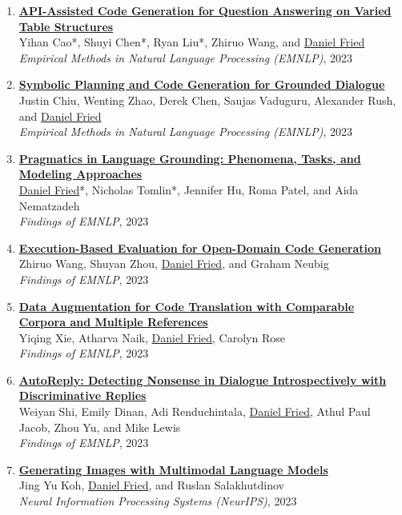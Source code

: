 \begin{enumerate}[leftmargin=-1mm,partopsep=0pt]
\item \href{https://arxiv.org/abs/2310.14687}{\textbf{API-Assisted Code Generation for Question Answering on Varied Table Structures}} \\
  Yihan Cao*, Shuyi Chen*, Ryan Liu*, Zhiruo Wang, and \underline{Daniel Fried}\\
  \emph{Empirical Methods in Natural Language Processing (EMNLP)}, 2023

\item \href{https://arxiv.org/abs/2310.17140}{\textbf{Symbolic Planning and Code Generation for Grounded Dialogue }} \\
  Justin Chiu, Wenting Zhao, Derek Chen, Saujas Vaduguru, Alexander Rush, and \underline{Daniel Fried}\\
  \emph{Empirical Methods in Natural Language Processing (EMNLP)}, 2023

\item \href{https://arxiv.org/abs/2211.08371}{\textbf{Pragmatics in Language Grounding: Phenomena, Tasks, and Modeling Approaches}} \\
  \underline{Daniel Fried}*, Nicholas Tomlin*, Jennifer Hu, Roma Patel, and Aida Nematzadeh\\
  \emph{Findings of EMNLP}, 2023

\item \href{https://arxiv.org/abs/2212.10481}{\textbf{Execution-Based Evaluation for Open-Domain Code Generation}} \\
  Zhiruo Wang, Shuyan Zhou, \underline{Daniel Fried}, and Graham Neubig\\
  \emph{Findings of EMNLP}, 2023

\item \href{https://arxiv.org/abs/2311.00317}{\textbf{Data Augmentation for Code Translation with Comparable Corpora and Multiple References}} \\
  Yiqing Xie, Atharva Naik, \underline{Daniel Fried}, Carolyn Rose\\
  \emph{Findings of EMNLP}, 2023

\item \href{https://arxiv.org/abs/2211.12615}{\textbf{AutoReply: Detecting Nonsense in Dialogue Introspectively with Discriminative Replies}} \\
  Weiyan Shi, Emily Dinan, Adi Renduchintala, \underline{Daniel Fried}, Athul Paul Jacob, Zhou Yu, and Mike Lewis\\
  \emph{Findings of EMNLP}, 2023

\item \href{https://arxiv.org/abs/2305.17216}{\textbf{Generating Images with Multimodal Language Models}} \\
  Jing Yu Koh, \underline{Daniel Fried}, and Ruslan Salakhutdinov\\
  \emph{Neural Information Processing Systems (NeurIPS)}, 2023


\end{enumerate}
